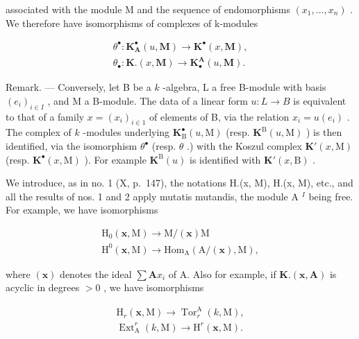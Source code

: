 associated with the module M and the sequence of endomorphisms \((x_{1}, \ldots, x_{n})\) . We therefore have isomorphisms of complexes of k-modules

\[
\begin{array}{l} \theta^ {\bullet}: \mathbf {K} _ {\mathbf {A}} ^ {\bullet} (u, \mathbf {M}) \to \mathbf {K} ^ {\bullet} (x, \mathbf {M}), \\ \theta_ {\bullet}: \mathbf {K}. (x, \mathbf {M}) \to \mathbf {K} _ {\bullet} ^ {\mathbf {A}} (u, \mathbf {M}). \end{array}
\]

Remark. --- Conversely, let B be a \(k\) -algebra, L a free B-module with basis \((e_i)_{i \in I}\) , and M a B-module. The data of a linear form \(u: L \to B\) is equivalent to that of a family \(x = (x_i)_{i \in 1}\) of elements of B, via the relation \(x_i = u(e_i)\) . The complex of \(k\) -modules underlying \(\mathbf{K}_{\mathrm{B}}^{\bullet}(u, \mathrm{M})\) (resp. \(\mathbf{K}^{\mathrm{B}}(u, \mathrm{M})\) ) is then identified, via the isomorphism \(\theta^{\bullet}\) (resp. \(\theta\) .) with the Koszul complex \(\mathbf{K}'(x, \mathrm{M})\) (resp. \(\mathbf{K}^{\bullet}(x, \mathrm{M})\) ). For example \(\mathbf{K}^{\mathrm{B}}(u)\) is identified with \(\mathbf{K}'(x, \mathrm{B})\) .

We introduce, as in no. 1 (X, p.~147), the notations H.(x, M), H.(x, M), etc., and all the results of nos. 1 and 2 apply mutatis mutandis, the module A \(^{I}\) being free. For example, we have isomorphisms

\[
\begin{array}{l} \mathrm{H} _ {0} (\boldsymbol {x}, \mathrm{M}) \to \mathrm{M} / (\boldsymbol {x}) \mathrm{M} \\ \mathrm{H} ^ {0} (\boldsymbol {x}, \mathrm{M}) \to \mathrm{Hom} _ {\mathrm{A}} \left(\mathrm{A} / (\boldsymbol {x}), \mathrm{M}\right), \end{array}
\]

where \((\pmb{x})\) denotes the ideal \(\sum \mathbf{A}x_{i}\) of A. Also for example, if \(\mathbf{K}.(\pmb{x},\mathbf{A})\) is acyclic in degrees \(>0\) , we have isomorphisms

\[
\begin{array}{l}\mathrm{H} _ {r} (\boldsymbol {x}, \mathrm{M}) \rightarrow \operatorname{Tor} _ {r} ^ {\mathrm{A}} (k, \mathrm{M}),\\\operatorname{Ext} _ {\mathrm{A}} ^ {r} (k, \mathrm{M}) \rightarrow \mathrm{H} ^ {r} (\boldsymbol {x}, \mathrm{M}).\end{array}
\]

